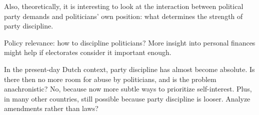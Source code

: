 
Also, theoretically, it is interesting to look at the interaction between political party demands and politicians' own position: what determines the strength of party discipline.




Policy relevance: how to discipline politicians? More insight into personal finances might help if electorates consider it important enough. 


In the present-day Dutch context, party discipline has almost become absolute. Is there then no more room for abuse by politicians, and is the problem anachronistic? No, because now more subtle ways to prioritize self-interest. Plus, in many other countries, still possible because party discipline is looser. Analyze amendments rather than laws?




\clearpage




